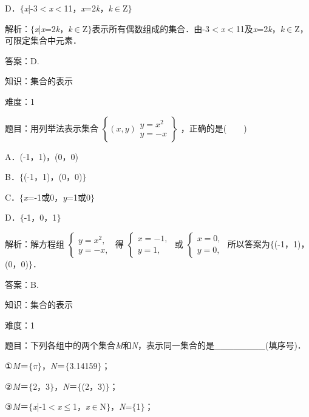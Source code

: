 \documentclass{article} %
\begin{document}
D．$\mathrm{\{}$\textit{x}|-3$\mathrm{<}$\textit{x}$\mathrm{<}$11，\textit{x}=2\textit{k}，\textit{k}$\mathrm{\in}$Z$\mathrm{\}}$

解析：$\mathrm{\{}$\textit{x}|\textit{x}=2\textit{k}，\textit{k}$\mathrm{\in}$Z$\mathrm{\}}$表示所有偶数组成的集合．由-3$\mathrm{<}$\textit{x}$\mathrm{<}$11及\textit{x}=2\textit{k}，\textit{k}$\mathrm{\in}$Z，可限定集合中元素．

答案：D.

知识：集合的表示

难度：1

题目：用列举法表示集合
$\left\{
(x,y) 
\begin{array}{|l}
	y=x^{2}\\
	y=-x
\end{array}
\right\}$
，正确的是(　　)

A．(-1，1)，(0，0)     

B．$\mathrm{\{}$(-1，1)，(0，0)$\mathrm{\}}$

C．$\mathrm{\{}$\textit{x}=-1或0，\textit{y}=1或0$\mathrm{\}}$   

D．$\mathrm{\{}$-1，0，1$\mathrm{\}}$

解析：解方程组
$\left\{
\begin{array}{l}
y=x^{2},\\
y=-x,
\end{array}
\right.$
得
$\left\{
\begin{array}{l}
x=-1,\\
y=1,
\end{array}
\right.$
或
$\left\{
\begin{array}{l}
x=0,\\
y=0,
\end{array}
\right.$
所以答案为$\mathrm{\{}$(-1，1)，(0，0)$\mathrm{\}}$．

答案：B.

知识：集合的表示

难度：1

题目：下列各组中的两个集合\textit{M}和\textit{N}，表示同一集合的是\_\_\_\_\_\_\_\_(填序号)．

①\textit{M}＝$\mathrm{\{}$$\pi$$\mathrm{\}}$，\textit{N}＝$\mathrm{\{}$3.14159$\mathrm{\}}$；

②\textit{M}＝$\mathrm{\{}$2，3$\mathrm{\}}$，\textit{N}＝$\mathrm{\{}$(2，3)$\mathrm{\}}$；

③\textit{M}＝$\mathrm{\{}$\textit{x}|-1$\mathrm{<}$\textit{x}$\mathrm{\le}$1，\textit{x}$\mathrm{\in}$N$\mathrm{\}}$，\textit{N}=$\mathrm{\{}$1$\mathrm{\}}$；
\end{document}
